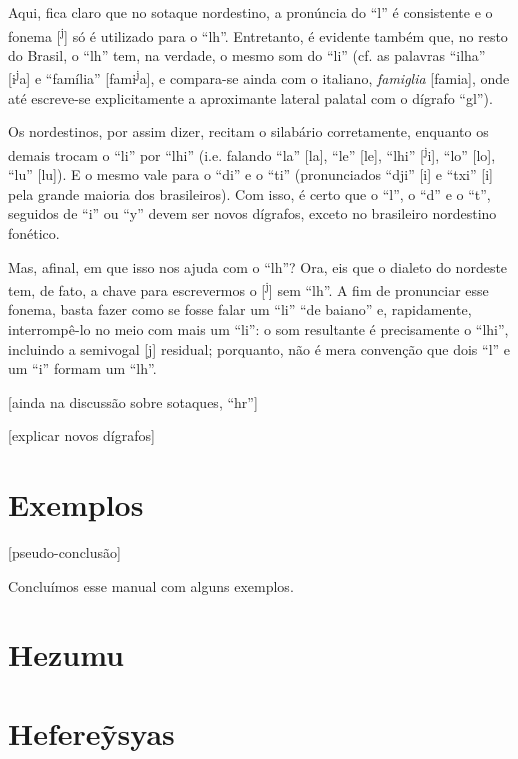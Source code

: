 \documentclass[12pt, a5paper, titlepage]{article}
\begin{document}
Aqui, fica claro que no sotaque nordestino, a pronúncia do ``l'' é consistente e o fonema [\textsuperscript{j}] só é utilizado para o ``lh''. Entretanto, é evidente também que, no resto do Brasil, o ``lh'' tem, na verdade, o mesmo som do ``li'' (cf. as palavras ``ilha'' [\textprimstress i\textsuperscript{j}a] e ``família'' [fa\textprimstress mi\textsuperscript{j}a], e compara-se ainda com o italiano, \textit{famiglia} [fa\textprimstress mi\textturny a], onde até escreve-se explicitamente a aproximante lateral palatal com o dígrafo ``gl'').

Os nordestinos, por assim dizer, recitam o silabário corretamente, enquanto os demais trocam o ``li'' por ``lhi'' (i.e. falando ``la'' [la], ``le'' [le], ``lhi'' [\textsuperscript{j}i], ``lo'' [lo], ``lu'' [lu]). E o mesmo vale para o ``di'' e o ``ti'' (pronunciados ``dji'' [i] e ``txi'' [i] pela grande maioria dos brasileiros). Com isso, é certo que o ``l'', o ``d'' e o ``t'', seguidos de ``i'' ou ``y'' devem ser novos dígrafos, exceto no brasileiro nordestino fonético.

Mas, afinal, em que isso nos ajuda com o ``lh''? Ora, eis que o dialeto do nordeste tem, de fato, a chave para escrevermos o [\textsuperscript{j}] sem ``lh''. A fim de pronunciar esse fonema, basta fazer como se fosse falar um ``li'' ``de baiano'' e, rapidamente, interrompê-lo no meio com mais um ``li'': o som resultante é precisamente o ``lhi'', incluindo a semivogal [j] residual; porquanto, não é mera convenção que dois ``l'' e um ``i'' formam um ``lh''.

[ainda na discussão sobre sotaques, ``hr'']

[explicar novos dígrafos]


\section{Exemplos}
 [pseudo-conclusão]

Concluímos esse manual com alguns exemplos.

\newpage
\section{Hezumu}

\newpage
\section{Hefere\~ysyas}
\end{document}
